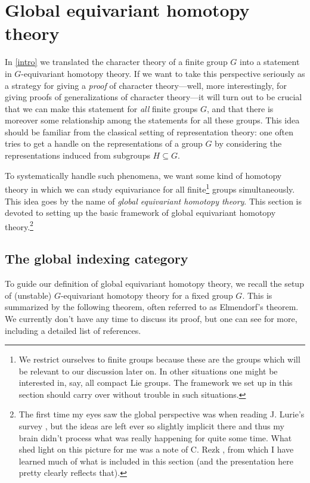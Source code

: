 \section{Global equivariant homotopy theory}
\label{global}

In \cref{intro} we translated the character theory of a finite group
$G$ into a statement in $G$-equivariant homotopy theory. If we want to
take this perspective seriously as a strategy for giving a
\emph{proof} of character theory---well, more interestingly, for
giving proofs of generalizations of character theory---it will turn
out to be crucial that we can make this statement for \emph{all}
finite groups $G$, and that there is moreover some relationship among
the statements for all these groups. This idea should be familiar from
the classical setting of representation theory: one often tries to get
a handle on the representations of a group $G$ by considering the
representations induced from subgroups $H \subseteq G$.

To systematically handle such phenomena, we want some kind of homotopy
theory in which we can study equivariance for all finite\footnote{We
  restrict ourselves to finite groups because these are the groups
  which will be relevant to our discussion later on. In other
  situations one might be interested in, say, all compact Lie
  groups. The framework we set up in this section should carry over
  without trouble in such situations.}  groups simultaneously. This
idea goes by the name of \emph{global equivariant homotopy
  theory}. This section is devoted to setting up the basic framework
of global equivariant homotopy theory.\footnote{The first time my eyes
  saw the global perspective was when reading J. Lurie's survey
  \cite{lurie-elliptic-survey}, but the ideas are left ever so
  slightly implicit there and thus my brain didn't process what was
  really happening for quite some time. What shed light on this
  picture for me was a note of C. Rezk \cite{rezk-global-cohesion},
  from which I have learned much of what is included in this section
  (and the presentation here pretty clearly reflects that).}


\subsection{The global indexing category}
\label{global-indexcat}

To guide our definition of global equivariant homotopy theory, we
recall the setup of (unstable) $G$-equivariant homotopy theory for a
fixed group $G$. This is summarized by the following theorem, often
referred to as Elmendorf's theorem. We currently don't have any time
to discuss its proof, but one can see \cite{nlab-equivhomotopy} for
more, including a detailed list of references.

